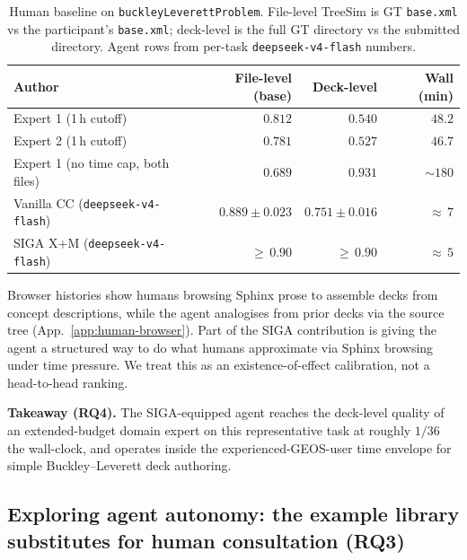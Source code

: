\documentclass{article}
\begin{document}
\begin{table}[h]
  \caption{Human baseline on \texttt{buckleyLeverettProblem}. File-level TreeSim is GT \texttt{base.xml} vs the participant's \texttt{base.xml}; deck-level is the full GT directory vs the submitted directory. Agent rows from per-task \texttt{deepseek-v4-flash} numbers.}
  \label{tab:human-baseline}
  \centering
  \small
  \begin{tabular}{lrrr}
    \toprule
    \textbf{Author} & \textbf{File-level (base)} & \textbf{Deck-level} & \textbf{Wall (min)} \\
    \midrule
    Expert 1 (1\,h cutoff)                          & $0.812$            & $0.540$            & $48.2$ \\
    Expert 2 (1\,h cutoff)                          & $0.781$            & $0.527$            & $46.7$ \\
    Expert 1 (no time cap, both files)              & $0.689$            & $0.931$            & ${\sim}180$ \\
    Vanilla CC (\texttt{deepseek-v4-flash})   & $0.889 \pm 0.023$  & $0.751 \pm 0.016$  & ${\approx}\,7$ \\
    SIGA X+M (\texttt{deepseek-v4-flash})     & ${\geq}\,0.90$     & ${\geq}\,0.90$     & ${\approx}\,5$ \\
    \bottomrule
  \end{tabular}
\end{table}

Browser histories show humans browsing Sphinx prose to assemble decks from concept descriptions, while the agent analogises from prior decks via the source tree (App.~\ref{app:human-browser}). Part of the SIGA contribution is giving the agent a structured way to do what humans approximate via Sphinx browsing under time pressure. We treat this as an existence-of-effect calibration, not a head-to-head ranking.

\textbf{Takeaway (RQ4).} The SIGA-equipped agent reaches the deck-level quality of an extended-budget domain expert on this representative task at roughly $1/36$ the wall-clock, and operates inside the experienced-GEOS-user time envelope for simple Buckley--Leverett deck authoring.

\subsection{Exploring agent autonomy: the example library substitutes for human consultation (RQ3)}
\label{subsec:autonomy}
\end{document}
